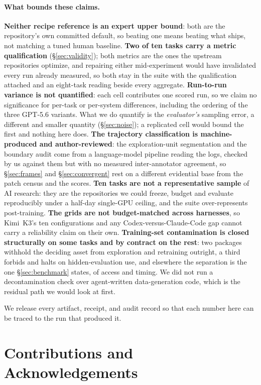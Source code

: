 \paragraph{What bounds these claims.}
\label{sec:limitations}
\textbf{Neither recipe reference is an expert upper bound}: both are the repository's own committed
default, so beating one means beating what ships, not matching a tuned human baseline. \textbf{Two of
ten tasks carry a metric qualification} (\S\ref{sec:validity}); both metrics are the ones the upstream
repositories optimize, and repairing either mid-experiment would have invalidated every run already
measured, so both stay in the suite with the qualification attached and an eight-task reading beside
every aggregate. \textbf{Run-to-run variance is not quantified}: each cell contributes one scored run,
so we claim no significance for per-task or per-system differences, including the ordering of the
three GPT-5.6 variants. What we do quantify is the \emph{evaluator's} sampling error, a different and
smaller quantity (\S\ref{sec:noise}); a replicated cell would bound the first and nothing here does.
\textbf{The trajectory classification is machine-produced and author-reviewed}: the exploration-unit
segmentation and the boundary audit come from a language-model pipeline reading the logs, checked by
us against them but with no measured inter-annotator agreement, so \S\ref{sec:frames} and
\S\ref{sec:convergent} rest on a different evidential base from the patch census and the scores.
\textbf{Ten tasks are not a representative sample} of AI research: they are the repositories we could
freeze, budget and evaluate reproducibly under a half-day single-GPU ceiling, and the suite
over-represents post-training. \textbf{The grids are not budget-matched across harnesses}, so Kimi~K3's
ten configurations and any Codex-versus-Claude-Code gap cannot carry a reliability claim on their own.
\textbf{Training-set contamination is closed structurally on some tasks and by contract on the rest}:
two packages withhold the deciding asset from exploration and retraining outright, a third forbids and
halts on hidden-evaluation use, and elsewhere the separation is the one \S\ref{sec:benchmark} states, of
access and timing. We did not run a decontamination check over agent-written data-generation code,
which is the residual path we would look at first.

We release every artifact, receipt, and audit
record so that each number here can be traced to the run that produced it.


\section{Contributions and Acknowledgements}
\label{sec:contributions}

